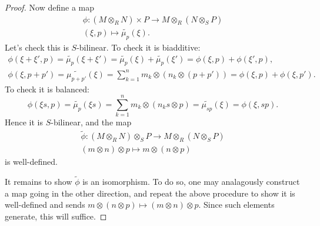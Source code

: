 \documentclass[12pt]{article}
\begin{document}
\begin{proof}
	Now define a map 
	\begin{gather*}
		\phi: (M\otimes_R N)\times P \to M\otimes_R (N\otimes_S P) \\
		(\xi, p) \mapsto \tilde{\mu_p}(\xi).
	\end{gather*}
	Let's check this is $S$-bilinear. To check it is biadditive:
	\begin{gather*}
		\phi(\xi+\xi',p) = \tilde{\mu_p}(\xi+\xi') = \tilde{\mu_p}(\xi) + \tilde{\mu_p}(\xi') = \phi(\xi,p)+\phi(\xi',p), \\
		\phi(\xi,p+p') = \tilde{\mu_{p+p'}}(\xi) = \sum_{k=1}^n m_k\otimes (n_k\otimes (p+p')) = \phi(\xi,p)+\phi(\xi,p').
	\end{gather*}
	To check it is balanced:
	\begin{equation*}
		\phi(\xi s,p) = \tilde{\mu_p}(\xi s) = \sum_{k=1}^n m_k\otimes (n_ks\otimes p) = \tilde{\mu_{sp}}(\xi) = \phi(\xi, sp).
	\end{equation*}
	Hence it is $S$-bilinear, and the map 
	\begin{gather*}
		\tilde{\phi}: (M\otimes_R N)\otimes_S P \to M\otimes_R(N\otimes_S P) \\
		(m\otimes n)\otimes p \mapsto m\otimes (n\otimes p)
	\end{gather*}
	is well-defined.

	It remains to show $\tilde{\phi}$ is an isomorphism. To do so, one may analagously construct a map going in the other direction, and repeat the above procedure to show it is well-defined and sends $m\otimes(n\otimes p)\mapsto (m\otimes n)\otimes p$. Since such elements generate, this will suffice.
\end{proof}
\end{document}
